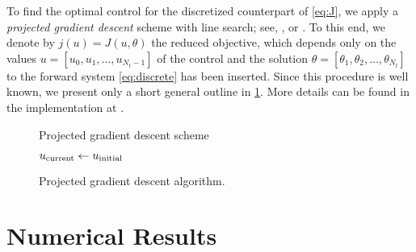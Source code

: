 To find the optimal control for the discretized counterpart of \eqref{eq:J}, we apply a \emph{projected gradient descent} scheme with line search; see, \eg, \cite{GafniBertsekas:1984:1,CalamaiMore:1987:1} or \cite[Chapter~5.8.2]{GeigerKanzow:2002:1}.
To this end, we denote by $j(u) = J(u,\theta)$ the reduced objective, which depends only on the values $u = [u_0, u_1, \ldots, u_{N_t-1}]$ of the control and the solution $\theta = [\theta_1, \theta_2, \ldots, \theta_{N_t}]$ to the forward system \eqref{eq:discrete} has been inserted.
Since this procedure is well known, we present only a short general outline in \cref{alg:projected_gradient_descent}.
More details can be found in the implementation at \cite[\texttt{optipuls.optimization}]{optipuls_github}.
 
\begin{figure}
	\begin{algorithm}[H]
	\caption{Projected gradient descent scheme}
	\DontPrintSemicolon
	$u_\textup{current} \gets u_\textup{initial}$\;
	\end{algorithm}
	\caption{Projected gradient descent algorithm.}
	\label{alg:projected_gradient_descent}
\end{figure}


\section{Numerical Results}
\label{sec:numericals}


